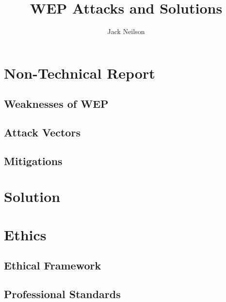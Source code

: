 \documentclass{article}
\begin{document}
\title{WEP Attacks and Solutions}
\author{Jack Neilson}
\maketitle

\tableofcontents
\newpage



\section{Non-Technical Report}
\subsection{Weaknesses of WEP}
\subsection{Attack Vectors}
\subsection{Mitigations}

\section{Solution}

\section{Ethics}
\subsection{Ethical Framework}
\subsection{Professional Standards}



\begin{appendices}


\end{appendices}
\end{document}
